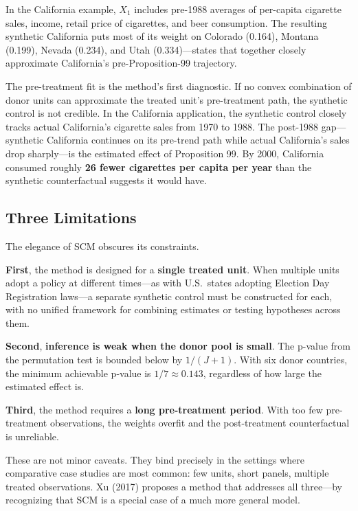 \documentclass[12pt]{article}
\begin{document}
In the California example, $X_1$ includes pre-1988 averages of
per-capita cigarette sales, income, retail price of cigarettes, and beer consumption.
The resulting synthetic California puts most of its weight on
Colorado (0.164), Montana (0.199), Nevada (0.234), and Utah (0.334)---states
that together closely approximate California's pre-Proposition-99 trajectory.

The pre-treatment fit is the method's first diagnostic.
If no convex combination of donor units can approximate the treated unit's
pre-treatment path, the synthetic control is not credible.
In the California application, the synthetic control closely tracks actual California's
cigarette sales from 1970 to 1988.
The post-1988 gap---synthetic California continues on its pre-trend path while
actual California's sales drop sharply---is the estimated effect of Proposition 99.
By 2000, California consumed roughly \textbf{26 fewer cigarettes per capita per year}
than the synthetic counterfactual suggests it would have.

\subsection{Three Limitations}

The elegance of SCM obscures its constraints.

\textbf{First}, the method is designed for a \textbf{single treated unit}.
When multiple units adopt a policy at different times---as with U.S.\ states
adopting Election Day Registration laws---a separate synthetic control must be
constructed for each, with no unified framework for combining estimates or
testing hypotheses across them.

\textbf{Second}, \textbf{inference is weak when the donor pool is small}.
The p-value from the permutation test is bounded below by $1/(J+1)$.
With six donor countries, the minimum achievable p-value is $1/7 \approx 0.143$,
regardless of how large the estimated effect is.

\textbf{Third}, the method requires a \textbf{long pre-treatment period}.
With too few pre-treatment observations, the weights overfit and the
post-treatment counterfactual is unreliable.

These are not minor caveats.
They bind precisely in the settings where comparative case studies are most common:
few units, short panels, multiple treated observations.
Xu (2017) proposes a method that addresses all three---by recognizing that SCM
is a special case of a much more general model.
\end{document}
